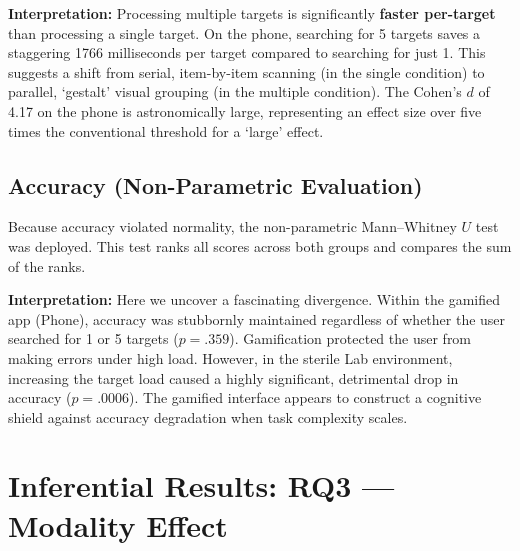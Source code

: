 \documentclass[11pt,a4paper]{article}
\begin{document}
\textbf{Interpretation:} Processing multiple targets is significantly \textbf{faster per-target} than processing a single target. On the phone, searching for 5 targets saves a staggering 1766 milliseconds per target compared to searching for just 1. This suggests a shift from serial, item-by-item scanning (in the single condition) to parallel, `gestalt' visual grouping (in the multiple condition). The Cohen's $d$ of 4.17 on the phone is astronomically large, representing an effect size over five times the conventional threshold for a `large' effect.

\subsection{Accuracy (Non-Parametric Evaluation)}
Because accuracy violated normality, the non-parametric Mann--Whitney $U$ test was deployed. This test ranks all scores across both groups and compares the sum of the ranks.

\begin{table}[htbp]
\centering
\caption{Mann--Whitney $U$ tests: Single vs.\ Multiple Target Accuracy.}
\label{tab:mwu_rq2}
\end{table}

\textbf{Interpretation:} Here we uncover a fascinating divergence. Within the gamified app (Phone), accuracy was stubbornly maintained regardless of whether the user searched for 1 or 5 targets ($p = .359$). Gamification protected the user from making errors under high load. However, in the sterile Lab environment, increasing the target load caused a highly significant, detrimental drop in accuracy ($p = .0006$). The gamified interface appears to construct a cognitive shield against accuracy degradation when task complexity scales.

\section{Inferential Results: RQ3 --- Modality Effect}
\label{sec:rq3}
\end{document}
